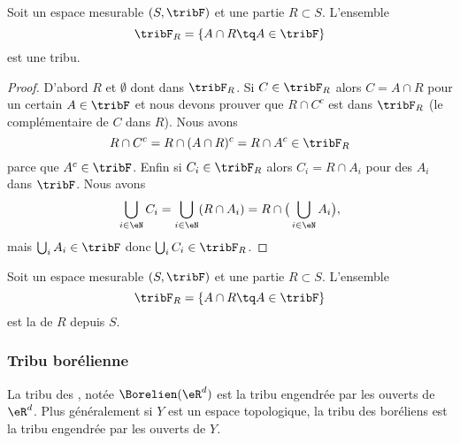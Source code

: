 \begin{proposition}
    Soit un espace mesurable \( (S,\tribF)  \) et une partie \( R\subset S\). L'ensemble
    \begin{equation}
        \tribF_R=\{ A\cap R\tq A\in\tribF \}
    \end{equation}
    est une tribu.
\end{proposition}

\begin{proof}
    D'abord \( R\) et \( \emptyset\) dont dans \( \tribF_R\). Si \( C\in\tribF_R \) alors \( C=A\cap R\) pour un certain \( A\in \tribF\) et nous devons prouver que \( R\cap C^c\) est dans \( \tribF_R\) (le complémentaire de \( C\) dans \( R\)). Nous avons
    \begin{equation}
        R\cap C^c=R\cap(A\cap R)^c=R\cap A^c\in \tribF_R
    \end{equation}
    parce que \( A^c\in \tribF\). Enfin si \( C_i\in \tribF_R\) alors \( C_i=R\cap A_i\) pour des \( A_i\) dans \( \tribF\). Nous avons
    \begin{equation}
        \bigcup_{i\in \eN}C_i=\bigcup_{i\in \eN}(R\cap A_i)=R\cap\big( \bigcup_{i\in \eN}A_i \big),
    \end{equation}
    mais \( \bigcup_iA_i \in \tribF\) donc \( \bigcup_iC_i\in \tribF_R\).
\end{proof}

\begin{definition}      \label{DefDHTTooWNoKDP}
    Soit un espace mesurable \( (S,\tribF)  \) et une partie \( R\subset S\). L'ensemble
    \begin{equation}
        \tribF_R=\{ A\cap R\tq A\in\tribF \}
    \end{equation}
    est la  de \( R\) depuis \( S\).
\end{definition}

\subsubsection{Tribu borélienne}

\begin{definition}
    La tribu des , notée \( \Borelien(\eR^d)\) est la tribu engendrée par les ouverts de \( \eR^d\). Plus généralement si \( Y\) est un espace topologique, la tribu des boréliens est la tribu engendrée par les ouverts de \( Y\).
\end{definition}

